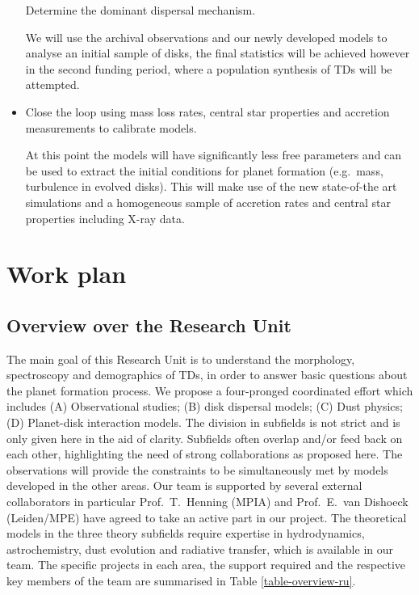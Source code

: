 \documentclass[10pt,fleqn,twoside]{article}
\begin{document}
\begin{itemize}
\begin{Emphasize}
  Determine the dominant dispersal mechanism.
\end{Emphasize}
We will
use the archival observations and our newly developed models to analyse
an initial sample of disks, the final statistics will be achieved
however in the second funding period, where a population synthesis of
TDs will be attempted.
\item 
\begin{Emphasize}
  Close the loop using mass loss rates, central star properties and
  accretion measurements to calibrate models.
\end{Emphasize}
At this
point the models will have significantly less free parameters and can
be used to extract the initial conditions for planet formation
(e.g.\ mass, turbulence in evolved disks). This will make use of the new state-of-the
art simulations and a homogeneous sample of accretion rates and central
star properties including X-ray data. 
\end{itemize}

\section{Work plan}

\subsection{Overview over the Research Unit}
%
The main goal of this Research Unit is to understand the morphology,
spectroscopy and demographics of TDs, in order to answer
basic questions about the planet formation process. We propose a
four-pronged coordinated effort which includes (A) Observational
studies; (B) disk dispersal models; (C) Dust physics; (D) Planet-disk
interaction models. The division in subfields is not strict and is
only given here in the aid of clarity. Subfields often overlap and/or
feed back on each other, highlighting the need of strong
collaborations as proposed here. The observations will provide the
constraints to be simultaneously met by models developed in the other
areas. Our team is supported by several external collaborators in particular
Prof.\ T.\ Henning (MPIA) and Prof.\ E.\ van Dishoeck (Leiden/MPE) have
agreed to take an active part in our project. The theoretical models in the three theory subfields require
expertise in hydrodynamics, astrochemistry, dust evolution and
radiative transfer, which is available in our team. The specific
projects in each area, the support required and the respective key members
of the team are summarised in Table \ref{table-overview-ru}.
\end{document}
